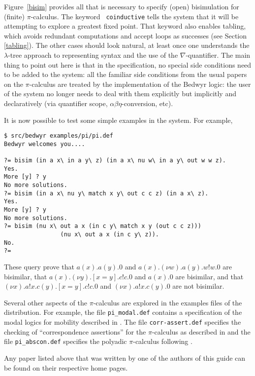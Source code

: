 \documentclass{article}
\begin{document}
Figure~\ref{bisim} provides all that is necessary to specify (open)
bisimulation for (finite) $\pi$-calculus.  The keyword {\tt
coinductive} tells the system that it will be attempting to explore a
greatest fixed point. That keyword also enables tabling, which avoids redundant
computations and accept loops as successes (see Section \ref{tabling}).
The other cases should look natural, at least
once one understands the $\lambda$-tree approach to representing syntax
and the use of the $\nabla$-quantifier.  The main thing to point out
here is that in the specification, no special side conditions need to
be added to the system: all the familiar side conditions from the
usual papers on the $\pi$-calculus are treated by the implementation
of the Bedwyr logic: the user of the system no longer needs to deal
with them explicitly but implicitly and declaratively (via quantifier
scope, $\alpha\beta\eta$-conversion, etc).

It is now possible to test some simple examples in the system.  For
example,
\begin{verbatim}
$ src/bedwyr examples/pi/pi.def
Bedwyr welcomes you....

?= bisim (in a x\ in a y\ z) (in a x\ nu w\ in a y\ out w w z).
Yes.
More [y] ? y
No more solutions.
?= bisim (in a x\ nu y\ match x y\ out c c z) (in a x\ z).
Yes.
More [y] ? y
No more solutions.
?= bisim (nu x\ out a x (in c y\ match x y (out c c z)))
                (nu x\ out a x (in c y\ z)).
No.
?=
\end{verbatim}
These query prove that
$a(x).a(y).0$ and $a(x).(\nu w).a(y).w!w.0$ are bisimilar,
that
$a(x).(\nu y).[x=y].c!c.0$ and $a(x).0$ are bisimilar, and that
$(\nu x).a!x.c(y).[x=y].c!c.0$ and
$(\nu x).a!x.c(y).0$ are not bisimilar.

Several other aspects of the $\pi$-calculus are explored in the
examples files of the distribution.  For example, the file
\verb+pi_modal.def+ contains a specification of the modal logics for
mobility described in \cite{milner93tcs}.  The file
\verb+corr-assert.def+ specifies the checking of ``correspondence
assertions'' for the $\pi$-calculus as described in \cite{gordon03tcs}
and the file \verb+pi_abscon.def+ specifies the polyadic
$\pi$-calculus following \cite{milner99book}.



\noindent Any paper listed above that was written by one of the
authors of this guide can be found on their respective home pages.
\end{document}
